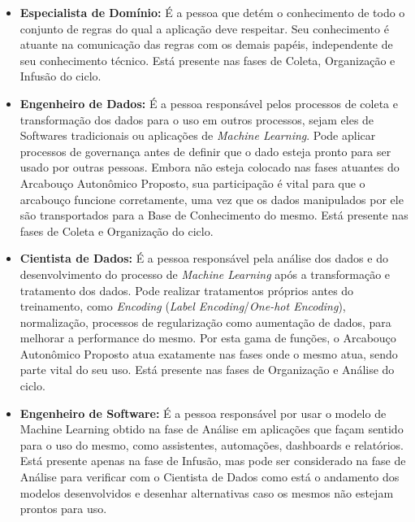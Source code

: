\documentclass[Portugues,Final]{ic-tese-v3}
\begin{document}
\begin{itemize}
\item \textbf{Especialista de Domínio:} É a pessoa que detém o conhecimento de todo o conjunto de regras do qual a aplicação deve respeitar. Seu conhecimento é atuante na comunicação das regras com os demais papéis, independente de seu conhecimento técnico. Está presente nas fases de Coleta, Organização e Infusão do ciclo.

\item \textbf{Engenheiro de Dados:} É a pessoa responsável pelos processos de coleta e transformação dos dados para o uso em outros processos, sejam eles de Softwares tradicionais ou aplicações de \textit{Machine Learning}. Pode aplicar processos de governança antes de definir que o dado esteja pronto para ser usado por outras pessoas. Embora não esteja colocado nas fases atuantes do Arcabouço Autonômico Proposto, sua participação é vital para que o arcabouço funcione corretamente, uma vez que os dados manipulados por ele são transportados para a Base de Conhecimento do mesmo. Está presente nas fases de Coleta e Organização do ciclo.

\item \textbf{Cientista de Dados:} É a pessoa responsável pela análise dos dados e do desenvolvimento do processo de \textit{Machine Learning} após a transformação e tratamento dos dados. Pode realizar tratamentos próprios antes do treinamento, como \textit{Encoding} (\textit{Label Encoding}/\textit{One-hot Encoding}), normalização, processos de regularização como aumentação de dados, para melhorar a performance do mesmo. Por esta gama de funções, o Arcabouço Autonômico Proposto atua exatamente nas fases onde o mesmo atua, sendo parte vital do seu uso. Está presente nas fases de Organização e Análise do ciclo.

\item \textbf{Engenheiro de Software:} É a pessoa responsável por usar o modelo de Machine Learning obtido na fase de Análise em aplicações que façam sentido para o uso do mesmo, como assistentes, automações, dashboards e relatórios. Está presente apenas na fase de Infusão, mas pode ser considerado na fase de Análise para verificar com o Cientista de Dados como está o andamento dos modelos desenvolvidos e desenhar alternativas caso os mesmos não estejam prontos para uso.
\end{itemize}
\end{document}
